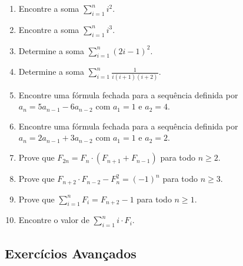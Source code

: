 \documentclass[12pt,a4paper]{article}
\begin{document}
\begin{enumerate}
    \item Encontre a soma $\sum_{i=1}^{n} i^2$.
    
    \item Encontre a soma $\sum_{i=1}^{n} i^3$.
    
    \item Determine a soma $\sum_{i=1}^{n} (2i-1)^2$.
    
    \item Determine a soma $\sum_{i=1}^{n} \frac{1}{i(i+1)(i+2)}$.
    
    \item Encontre uma fórmula fechada para a sequência definida por $a_n = 5a_{n-1} - 6a_{n-2}$ com $a_1 = 1$ e $a_2 = 4$.
    
    \item Encontre uma fórmula fechada para a sequência definida por $a_n = 2a_{n-1} + 3a_{n-2}$ com $a_1 = 1$ e $a_2 = 2$.
    
    \item Prove que $F_{2n} = F_n \cdot (F_{n+1} + F_{n-1})$ para todo $n \geq 2$.
    
    \item Prove que $F_{n+2} \cdot F_{n-2} - F_n^2 = (-1)^n$ para todo $n \geq 3$.
    
    \item Prove que $\sum_{i=1}^{n} F_i = F_{n+2} - 1$ para todo $n \geq 1$.
    
    \item Encontre o valor de $\sum_{i=1}^{n} i \cdot F_i$.
\end{enumerate}

\subsection{Exercícios Avançados}
\end{document}
